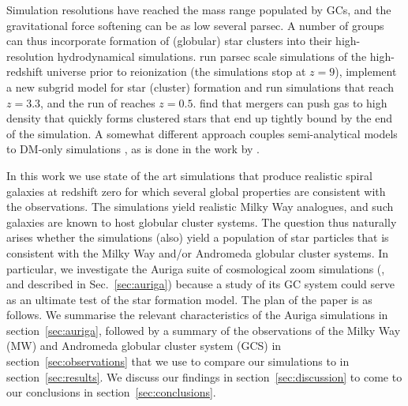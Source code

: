 \documentclass[a4paper,fleqn,usenatbib]{mnras}
\begin{document}
Simulation resolutions have reached the mass range populated by GCs, and the
gravitational force softening can be as low several parsec. A number of groups 
can thus incorporate formation of (globular) star clusters into their 
high-resolution hydrodynamical simulations. \citet{2016ApJ...831..204R} 
run parsec scale simulations of the high-redshift universe 
prior to reionization (the simulations stop at $z=9$), \citet{2017ApJ...834...69L} 
implement a new subgrid model for star (cluster) formation and run simulations 
that reach $z=3.3$, and the run of \citet{2017MNRAS.465.3622R} reaches $z=0.5$. 
\citet{2018MNRAS.474.4232K} find that mergers can push gas to high density that
quickly forms clustered stars that end up tightly bound by the end of the 
simulation. A somewhat different approach couples semi-analytical models to DM-only
simulations \citep{2010ApJ...718.1266M,2014ApJ...796...10L,2018MNRAS.480.2343C,
2019MNRAS.486..331C,2019arXiv190505199C}, as is done in the work by 
\citet{2019MNRAS.482.4528E}.



In this work we use state of the art simulations that produce realistic spiral 
galaxies at redshift zero for which several global properties are consistent with 
the observations. The simulations yield realistic Milky Way analogues, and such
galaxies are known to host globular cluster systems. The question thus naturally 
arises whether the simulations (also) yield a population of star particles that 
is consistent with the Milky Way and/or Andromeda globular cluster systems. In 
particular, we investigate the Auriga suite of cosmological zoom simulations 
(\citealt{2017MNRAS.467..179G}, and described in Sec.~\ref{sec:auriga}) because
a study of its GC system could serve as an ultimate test of the star formation 
model. The plan of the paper is as follows. We summarise the relevant characteristics 
of the Auriga simulations in section~\ref{sec:auriga}, followed by a summary of 
the observations of the Milky Way (MW) and Andromeda globular cluster system (GCS)
in section~\ref{sec:observations} that we use to compare our simulations to in
section~\ref{sec:results}. We discuss our findings in section~\ref{sec:discussion}
to come to our conclusions in section~\ref{sec:conclusions}.
\end{document}
